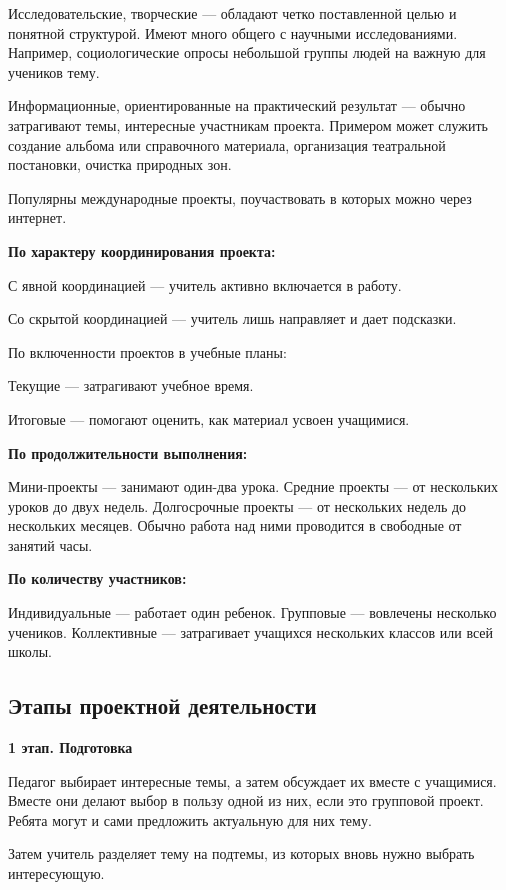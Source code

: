 \documentclass[a4paper, 12pt]{extarticle}
\begin{document}
    Исследовательские, творческие — обладают четко поставленной целью и понятной структурой. Имеют много общего с научными исследованиями. Например, социологические опросы небольшой группы людей на важную для учеников тему.
    
    Информационные, ориентированные на практический результат — обычно затрагивают темы, интересные участникам проекта. Примером может служить создание альбома или справочного материала, организация театральной постановки, очистка природных зон. 
    
    Популярны международные проекты, поучаствовать в которых можно через интернет.

    \textbf{По характеру координирования проекта:}

    С явной координацией — учитель активно включается в работу.
    
    Со скрытой координацией — учитель лишь направляет и дает подсказки.
    
    По включенности проектов в учебные планы:
    
    Текущие — затрагивают учебное время.
    
    Итоговые — помогают оценить, как материал усвоен учащимися.

    \textbf{По продолжительности выполнения:}

    Мини-проекты — занимают один-два урока.
    Средние проекты — от нескольких уроков до двух недель.
    Долгосрочные проекты — от нескольких недель до нескольких месяцев. Обычно работа над ними проводится в свободные от занятий часы.

    \textbf{По количеству участников:}

    Индивидуальные — работает один ребенок.
    Групповые — вовлечены несколько учеников.
    Коллективные — затрагивает учащихся нескольких классов или всей школы.

\subsection*{Этапы проектной деятельности}

\textbf{1 этап. Подготовка}

Педагог выбирает интересные темы, а затем обсуждает их вместе с учащимися. Вместе они делают выбор в пользу одной из них, если это групповой проект. Ребята могут и сами предложить актуальную для них тему.

Затем учитель разделяет тему на подтемы, из которых вновь нужно выбрать интересующую.
\end{document}
